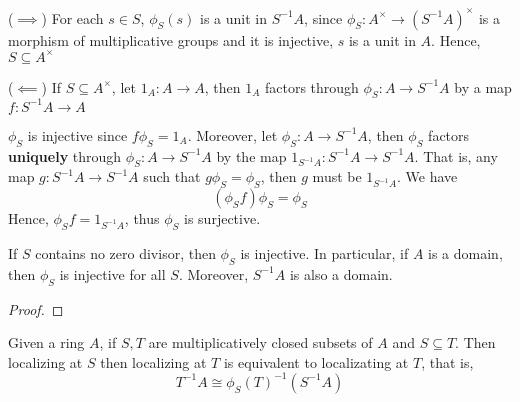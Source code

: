 \begin{longproof}
	($\implies$) For each $s \in S$, $\phi_S(s)$ is a unit in $S^{-1} A$, since $\phi_S: A^\times \to (S^{-1}A)^\times$ is a morphism of multiplicative groups and it is injective, $s$ is a unit in $A$. Hence, $S \subseteq A^\times$
	
	($\impliedby$) If $S \subseteq A^\times$, let $1_A: A \to A$, then $1_A$ factors through $\phi_S: A \to S^{-1} A$ by a map $f: S^{-1} A \to A$
	\begin{center}
	\end{center}
	
	$\phi_S$ is injective since $f \phi_S = 1_A$. Moreover, let $\phi_S: A \to S^{-1} A$, then $\phi_S$ factors \textbf{uniquely} through $\phi_S: A \to S^{-1} A$ by the map $1_{S^{-1} A}: S^{-1} A \to S^{-1} A$. That is, any map $g: S^{-1} A \to S^{-1} A$ such that $g \phi_S = \phi_S$, then $g$ must be $1_{S^{-1} A}$. We have
	$$
		(\phi_S f) \phi_S = \phi_S
	$$
	Hence, $\phi_S f = 1_{S^{-1} A}$, thus $\phi_S$ is surjective.
\end{longproof}

\begin{remark}
	If $S$ contains no zero divisor, then $\phi_S$ is injective. In particular, if $A$ is a domain, then $\phi_S$ is injective for all $S$. Moreover, $S^{-1}A$ is also a domain.
\end{remark}

\begin{proof}
\end{proof}

\begin{remark}
	Given a ring $A$, if $S, T$ are multiplicatively closed subsets of $A$ and $S \subseteq T$. Then localizing at $S$ then localizing at $T$ is equivalent to localizating at $T$, that is,
	$$
		T^{-1} A \cong \phi_S(T)^{-1} (S^{-1} A)
	$$
\end{remark}

